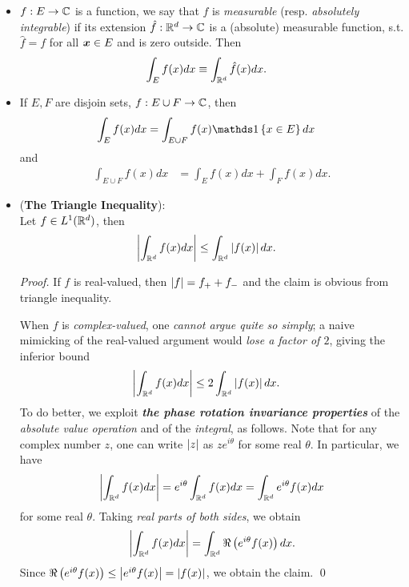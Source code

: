 \documentclass[11pt]{article}
\begin{document}
\begin{itemize}
\item \begin{exercise} $f : E \rightarrow {\mathbb C}$ is a function, we say that $f$ is \emph{measurable} (resp. \emph{absolutely integrable}) if its extension $\hat{f}: {\mathbb R}^{d } \rightarrow {\mathbb C}$ is a (absolute) measurable function, s.t. $\hat{f} = f$ for all $\boldsymbol{x}\in E$ and is zero outside. Then 
\begin{align*}
\int_{E}f(x)dx &\equiv \int_{{\mathbb R}^{d}}\hat{f}(x)dx.
\end{align*}
\end{exercise}

\item \begin{exercise}
If $E,F$ are disjoin sets, $f: E\cup F\rightarrow {\mathbb C}$, then 
\begin{align*}
\int_{E}f(x)dx &= \int_{E\cup F}f(x)\ind{x\in E}dx
\end{align*}
and
\begin{align*}
\int_{E\cup F}f(x)dx &= \int_{E}f(x)dx+ \int_{F}f(x)dx.
\end{align*}
\end{exercise}

\item \begin{lemma} (\textbf{The Triangle Inequality}):\\
Let  $f\in L^{1}({\mathbb R}^{d})$, then
\begin{align*}
\left\lvert \int_{{\mathbb R}^{d}}f(x)dx \right\rvert &\le \int_{{\mathbb R}^d}\left\lvert f(x) \right\rvert dx. 
\end{align*}
\end{lemma}
\begin{proof}
If $f$ is real-valued, then $\left\lvert f \right\rvert = f_{+} + f_{-}$ and the claim is obvious from triangle inequality. 

When $f$ is \emph{complex-valued}, one \emph{cannot argue quite so simply}; a naive mimicking of the real-valued argument would \emph{lose a factor of $2$}, giving the inferior bound
\begin{align*}
\left\lvert \int_{{\mathbb R}^{d}}f(x)dx \right\rvert &\le 2\int_{{\mathbb R}^d}\left\lvert f(x) \right\rvert dx. 
\end{align*}
To do better, we exploit \emph{\textbf{the phase rotation invariance properties}} of the \emph{absolute value operation} and of the \emph{integral}, as follows. Note that
for any complex number $z$, one can write $\left\lvert z \right\rvert$ as $ze^{i\theta}$ for some real $\theta$. In particular, we have
\begin{align*}
\left\lvert \int_{{\mathbb R}^{d}}f(x)dx \right\rvert= e^{i\theta} \int_{{\mathbb R}^{d}} f(x) dx = \int_{{\mathbb R}^{d}}  e^{i\theta} f(x) dx
\end{align*} for some real $\theta$. Taking \emph{real parts of both sides}, we obtain
\begin{align*}
\left\lvert \int_{{\mathbb R}^{d}}f(x)dx \right\rvert= \int_{{\mathbb R}^{d}}  \Re \left(e^{i\theta} f(x)\right) dx.
\end{align*}  Since $ \Re \left(e^{i\theta} f(x)\right) \le \left\lvert e^{i\theta}f(x) \right\rvert = \left\lvert f(x) \right\rvert$, we obtain the claim. \qed
\end{proof}
\end{itemize}
\newpage
\end{document}
